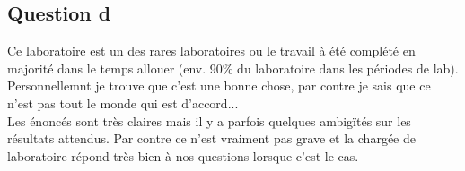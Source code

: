 \documentclass[oneside]{book}
\begin{document}
    \subsection*{Question d}
    Ce laboratoire est un des rares laboratoires ou le travail à été complété en majorité dans le temps allouer (env. 90\% du laboratoire dans les périodes de lab). Personnellemnt je trouve que c'est une bonne chose, par contre je sais que ce n'est pas tout le monde qui est d'accord...\\
    
    Les énoncés sont très claires mais il y a parfois quelques ambigïtés sur les résultats attendus. Par contre ce n'est vraiment pas grave et la chargée de laboratoire répond très bien à nos questions lorsque c'est le cas.\\
    
    
    
\end{document}
